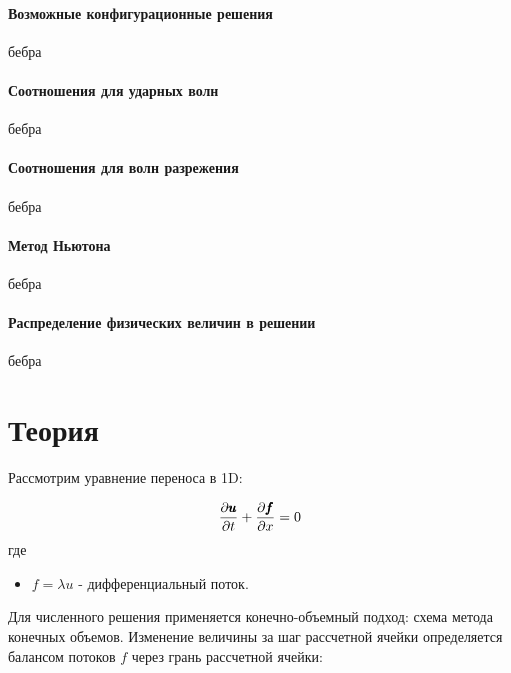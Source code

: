 \subsection{Возможные конфигурационные решения}\label{sect_configs}

бебра

\subsection{Соотношения для ударных волн}\label{sect_sw}

бебра

\subsection{Соотношения для волн разрежения}\label{sect_rw}

бебра

\subsection{Метод Ньютона}\label{sect_MethNewton}

бебра

\subsection{Распределение физических величин в решении}\label{sect_allSolutions}

бебра

\part{Теория}\label{part_theory}

Рассмотрим уравнение переноса в 1D:

\begin{equation}
	\frac{\partial \pmb{u}}{\partial t} + \frac{\partial \pmb{f}}{\partial x} = 0\\
\end{equation}
где
\begin{itemize}
	\item $f = \lambda u$ - дифференциальный поток.
\end{itemize}

Для численного решения применяется конечно-объемный подход: схема метода конечных объемов. Изменение величины за шаг рассчетной ячейки определяется балансом потоков $f$ через грань рассчетной ячейки:

